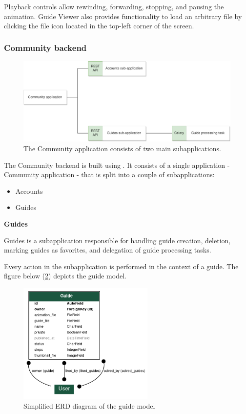 \medskip
Playback controls allow rewinding, forwarding, stopping, and pausing the animation. Guide Viewer also provides functionality to load an arbitrary  file by clicking the file icon located in the top-left corner of the screen.


\subsubsection{Community backend}

\begin{figure}[H]
  \caption{The Community application consists of two main subapplications.}
  \label{3-backend-community-components}
  \centering
    \includegraphics[width=\textwidth]{assets/3-community-application.png}
\end{figure}

The Community backend is built using . It consists of a single application - Community application - that is split into a couple of subapplications:

\begin{itemize}
	\item Accounts
	\item Guides
\end{itemize}

\textbf{Guides}

Guides is a subapplication responsible for handling guide creation, deletion, marking guides as favorites, and delegation of guide processing tasks.

\medskip

Every action in the subapplication is performed in the context of a guide. The figure below (\ref{model--guide}) depicts the guide model.

\begin{figure}[H]
  \caption{\label{model--guide}Simplified ERD diagram of the guide model}
    \centering
    \includegraphics[width=0.6\textwidth]{assets/3-erd-guides.png}
\end{figure}

